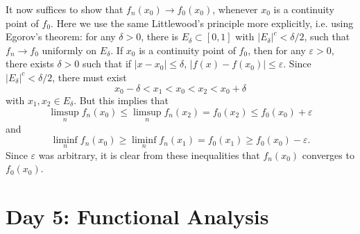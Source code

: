 \documentclass[answers]{exam}
\theoremstyle{problemstyle}
\newcommand{\1}[1]{\textbf{1}_{\left[#1\right]}} %
\begin{document}
\begin{questions}
\begin{solution}
	It now suffices to show that $f_n(x_0) \to f_0(x_0)$, whenever $x_0$ is a continuity point of $f_0$. Here we use the same Littlewood's principle more explicitly, i.e. using Egorov's theorem: for any $\delta > 0$, there is $E_\delta \subset [0,1]$ with $|E_\delta|^c < \delta/2$, such that $f_n \to f_0$ uniformly on $E_\delta$. If $x_0$ is a continuity point of $f_0$, then for any $\varepsilon > 0$, there exists $\delta > 0$ such that if $|x - x_0| \leq \delta$, $|f(x) - f(x_0)| \leq \varepsilon$. Since $|E_\delta|^c < \delta/2$, there must exist
	\[ x_0 - \delta < x_1 < x_0 < x_2 < x_0 + \delta \]
	with $x_1,x_2 \in E_\delta$. But this implies that
	\[ \limsup_n f_n(x_0) \leq \limsup_n f_n(x_2) = f_0(x_2) \leq f_0(x_0) + \varepsilon \]
	and
	\[ \liminf_n f_n(x_0) \geq \liminf_n f_n(x_1) = f_0(x_1) \geq f_0(x_0) - \varepsilon. \]
	Since $\varepsilon$ was arbitrary, it is clear from these inequalities that $f_n(x_0)$ converges to $f_0(x_0)$.
\end{solution}

\newpage
\section{Day 5: Functional Analysis}


\end{questions}
\end{document}
